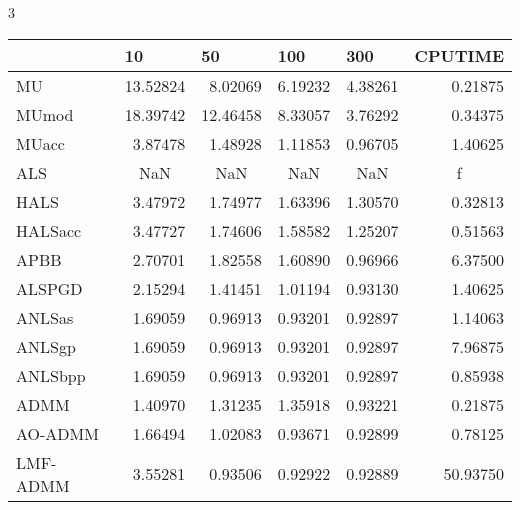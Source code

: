 \documentclass{article}
\begin{document}
3
\begin{table}[H]
		\centering
	\begin{tabular}{|l|r|r|r|r|r|}
		\hline
		& \multicolumn{1}{l|}{10}  & \multicolumn{1}{l|}{50}  & \multicolumn{1}{l|}{100} & \multicolumn{1}{l|}{300} & \multicolumn{1}{l|}{CPUTIME} \\ \hline
		MU       & 13.52824                 & 8.02069                  & 6.19232                  & 4.38261                  & 0.21875                      \\ \hline
		MUmod    & 18.39742                 & 12.46458                 & 8.33057                  & 3.76292                  & 0.34375                      \\ \hline
		MUacc    & 3.87478                  & 1.48928                  & 1.11853                  & 0.96705                  & 1.40625                      \\ \hline
		ALS      & \multicolumn{1}{c|}{NaN} & \multicolumn{1}{c|}{NaN} & \multicolumn{1}{c|}{NaN} & \multicolumn{1}{c|}{NaN} & \multicolumn{1}{c|}{f}       \\ \hline
		HALS     & 3.47972                  & 1.74977                  & 1.63396                  & 1.30570                  & 0.32813                      \\ \hline
		HALSacc  & 3.47727                  & 1.74606                  & 1.58582                  & 1.25207                  & 0.51563                      \\ \hline
		APBB     & 2.70701                  & 1.82558                  & 1.60890                  & 0.96966                  & 6.37500                      \\ \hline
		ALSPGD   & 2.15294                  & 1.41451                  & 1.01194                  & 0.93130                  & 1.40625                      \\ \hline
		ANLSas   & 1.69059                  & 0.96913                  & 0.93201                  & 0.92897                  & 1.14063                      \\ \hline
		ANLSgp   & 1.69059                  & 0.96913                  & 0.93201                  & 0.92897                  & 7.96875                      \\ \hline
		ANLSbpp  & 1.69059                  & 0.96913                  & 0.93201                  & 0.92897                  & 0.85938                      \\ \hline
		ADMM     & 1.40970                  & 1.31235                  & 1.35918                  & 0.93221                  & 0.21875                      \\ \hline
		AO-ADMM  & 1.66494                  & 1.02083                  & 0.93671                  & 0.92899                  & 0.78125                      \\ \hline
		LMF-ADMM & 3.55281                  & 0.93506                  & 0.92922                  & 0.92889                  & 50.93750                     \\ \hline
	\end{tabular}
\end{table}
\end{document}
